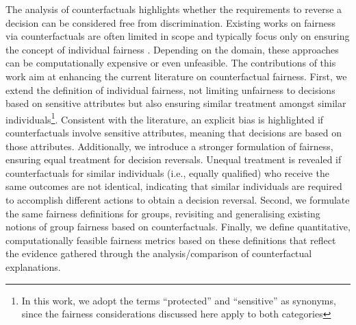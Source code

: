 \documentclass[letterpaper]{article} %
\begin{document}
The analysis of counterfactuals highlights whether the requirements to reverse a decision can be considered free from discrimination. Existing works on fairness via counterfactuals are often limited in scope and typically focus only on ensuring the concept of individual fairness \cite{NIPS2017_a486cd07,wachter2017counterfactual}.
%
Depending on the domain, these approaches can be computationally expensive or even unfeasible.
%
%
The contributions of this work aim at enhancing the current literature on counterfactual fairness.
%
First, we extend the definition of individual fairness, not limiting unfairness to decisions based on sensitive attributes but also ensuring similar treatment amongst similar individuals\footnote{In this work, we adopt the terms ``protected'' and ``sensitive'' as synonyms, since the fairness considerations discussed here apply to both categories}.
%
Consistent with the literature, an explicit bias is highlighted if counterfactuals involve sensitive attributes, meaning that decisions are based on those attributes. Additionally, we introduce a stronger formulation of fairness, ensuring equal treatment for decision reversals. Unequal treatment is revealed if counterfactuals for similar individuals (i.e., equally qualified) who receive the same outcomes are not identical, indicating that similar individuals are required to accomplish different actions to obtain a decision reversal.
%
Second, we formulate the same fairness definitions for groups, revisiting and generalising existing notions of group fairness based on counterfactuals.
%
Finally, we define quantitative, computationally feasible fairness metrics based on these definitions that reflect the evidence gathered through the analysis/comparison of counterfactual explanations.
\end{document}
